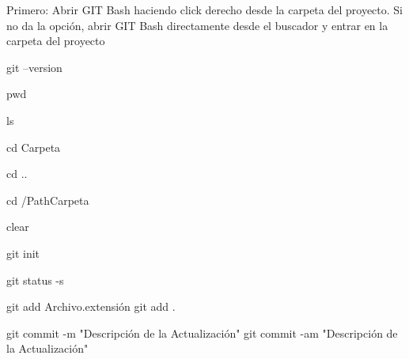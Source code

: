 
Primero: Abrir GIT Bash haciendo click derecho desde la carpeta del proyecto. Si no da la opción, abrir GIT Bash directamente desde el buscador y entrar en la carpeta del proyecto

	git --version		%

	pwd					%

	ls					%

	cd Carpeta			%

	cd ..				%

	cd /PathCarpeta		%

	clear				%



	git init		%

	git status -s	%

	git add Archivo.extensión	%
	git add .					%

	git commit -m "Descripción de la Actualización"		%
	git commit -am "Descripción de la Actualización"	%
	
